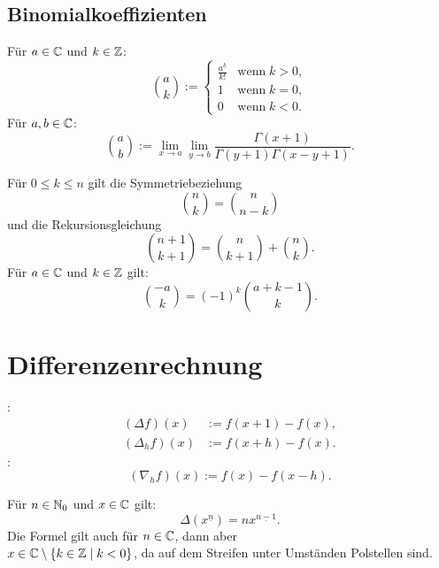 \subsection{Binomialkoeffizienten}
\begin{Definition}
Für $a\in\mathbb C$ und $k\in\mathbb Z$:
\begin{equation}
\binom{a}{k} := \begin{cases}
\frac{a^{\underline k}}{k!} & \text{wenn}\;k>0,\\
1 & \text{wenn}\;k=0,\\
0 & \text{wenn}\;k<0.
\end{cases}
\end{equation}
Für $a,b\in\mathbb C$:
\begin{equation}\label{eq:bc-allg}
\binom{a}{b} := \lim_{x\to a}\lim_{y\to b}
\frac{\Gamma(x+1)}{\Gamma(y+1)\Gamma(x-y+1)}.
\end{equation}
\end{Definition}
\noindent
Für $0\le k\le n$ gilt die Symmetriebeziehung
\begin{equation}
\binom{n}{k} = \binom{n}{n-k}
\end{equation}
und die Rekursionsgleichung
\begin{equation}
\binom{n+1}{k+1} = \binom{n}{k+1}+\binom{n}{k}.
\end{equation}
Für $a\in\mathbb C$ und $k\in\mathbb Z$ gilt:
\begin{equation}
\binom{-a}{k} = (-1)^k \binom{a+k-1}{k}.
\end{equation}

\section{Differenzenrechnung}
\begin{Definition} :
\begin{align}
(\Delta f)(x) &:= f(x+1)-f(x),\\
(\Delta_h f)(x) &:= f(x+h)-f(x).
\end{align}
:
\begin{equation}
(\nabla_h f)(x) := f(x)-f(x-h).
\end{equation}
\end{Definition}
\noindent
Für $n\in\mathbb N_0$ und $x\in\mathbb C$ gilt:
\begin{equation}
\Delta(x^{\underline{n}}) = nx^{\underline{n-1}}.
\end{equation}
Die Formel gilt auch für $n\in\mathbb C$, dann aber\\
$x\in\mathbb C\setminus\{k\in\mathbb Z\mid k<0\}$, da auf dem Streifen unter
Umständen Polstellen sind.

